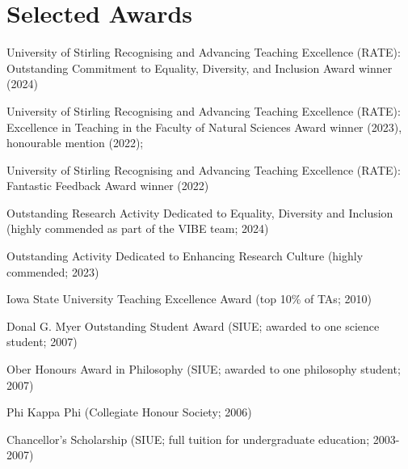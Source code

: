\documentclass[letterpaper]{article}
\renewenvironment{itemize}{
  \begin{list}{}{
    \setlength{\leftmargin}{1.5em}
  }
}{
  \end{list}
}
\begin{document}
\section*{Selected Awards}
\begin{itemize}
\item University of Stirling Recognising and Advancing Teaching Excellence (RATE): Outstanding Commitment to Equality, Diversity, and Inclusion Award winner (2024)
\item University of Stirling Recognising and Advancing Teaching Excellence (RATE): Excellence in Teaching in the Faculty of Natural Sciences Award winner (2023), honourable mention (2022);
\item University of Stirling Recognising and Advancing Teaching Excellence (RATE): Fantastic Feedback Award winner (2022)
\item Outstanding Research Activity Dedicated to Equality, Diversity and Inclusion (highly commended as part of the VIBE team; 2024)
\item Outstanding Activity Dedicated to Enhancing Research Culture (highly commended; 2023)
\item Iowa State University Teaching Excellence Award (top 10\% of TAs; 2010)
\item Donal G. Myer Outstanding Student Award (SIUE; awarded to one science student; 2007)
\item Ober Honours Award in Philosophy (SIUE; awarded to one philosophy student; 2007)
\item Phi Kappa Phi (Collegiate Honour Society; 2006)
\item Chancellor's Scholarship (SIUE; full tuition for undergraduate education; 2003-2007)
\end{itemize}
\end{document}
